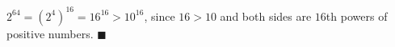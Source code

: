 $2^{64}=\left(2^4\right)^{16}=16^{16}>10^{16}$, since $16>10$ and both sides are $16$th powers of positive numbers. $\blacksquare$
